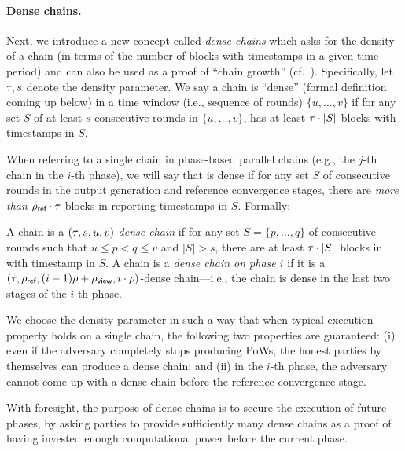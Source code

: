 

\paragraph{Dense chains.}
%
Next, we introduce a new concept called \emph{dense chains} which asks for the density of a chain (in terms of the number of blocks with timestamps in a given time period) and can also be used as a proof of ``chain growth'' (cf.~\cite{EPRINT:GarKiaLeo14}).
%
Specifically, let $\tau, s$ denote the density parameter.
%
We say a chain \chain is ``dense'' (formal definition coming up below) in a time window (i.e., sequence of rounds) $\{ u, \ldots, v \}$ if for any set $S$ of at least $s$ consecutive rounds in $\{ u, \ldots, v \}$, \chain has at least $\tau \cdot |S|$ blocks with timestamps in $S$.

When referring to a single chain \chain in phase-based parallel chains (e.g., the $j$-th chain in the $i$-th phase), we will say that \chain is dense if for any set $S$ of \phaseRefLength consecutive rounds in the output generation and reference convergence stages, there are \emph{more than} $\rho_{\textsf{ref}} \cdot \tau$ blocks in \chain reporting timestamps in $S$.
%
Formally:

\begin{definition} \label{def:dense-chains}
      A chain \chain is a \emph{$(\tau, s, u, v)$-dense chain} if for any set $S = \{p, \ldots, q \}$ of consecutive rounds such that $u \le p < q \le v$ and $|S| > s$, there are at least $\tau \cdot |S|$ blocks in \chain with timestamp in $S$.
      A chain \chain is a \emph{ dense chain on phase $i$} if it is a $(\tau, \rho_{\textsf{ref}}, (i - 1) \rho + \rho_{\textsf{view}}, i \cdot \rho)$-dense chain---i.e., the chain is dense in the last two stages of the $i$-th phase.
\end{definition}

We choose the density parameter \densityParam in such a way that when typical execution property holds on a single chain, the following two properties are guaranteed: (i) even if the adversary completely stops producing PoWs, the honest parties by themselves can produce a dense chain; and (ii) in the $i$-th phase, the adversary cannot come up with a dense chain before the reference convergence stage.

With foresight, the purpose of dense chains is to secure the execution of future phases, by asking parties to provide sufficiently many dense chains as a proof of having invested enough computational power before the current phase.

